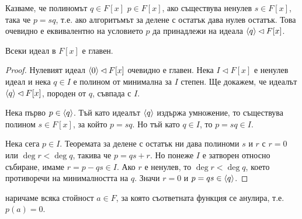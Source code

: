\documentclass[numbers=endperiod, bibliography=totocnumbered]{scrartcl}
\begin{document}
\begin{definition}
  Казваме, че полиномът \( q \in F[x] \)  \( p \in F[x] \), ако съществува ненулев \( s \in F[x] \), така че \( p = sq \), т.е. ако алгоритъмът за делене с остатък дава нулев остатък. Това очевидно е еквивалентно на условието \( p \) да принадлежи на идеала \( \left\langle q \right\rangle \lhd F[x] \).
\end{definition}

\begin{theorem}\label{thm:polynomial_ideals_are_principal}
  Всеки идеал в \( F[x] \) е главен.
\end{theorem}
\begin{proof}
  Нулевият идеал \( \left\langle 0 \right\rangle \lhd F[x] \) очевидно е главен. Нека \( I \lhd F[x] \) е ненулев идеал и нека \( q \in I \) е полином от минимална за \( I \) степен. Ще докажем, че идеалът \( \left\langle q \right\rangle \lhd F[x] \), породен от \( q \), съвпада с \( I \).

  Нека първо \( p \in \left\langle q \right\rangle \). Тъй като идеалът \( \left\langle q \right\rangle \) издържа умножение, то съществува полином \( s \in F[x] \), за който \( p = sq \). Но тъй като \( q \in I \), то \( p = sq \in I \).

  Нека сега \( p \in I \). Теоремата за делене с остатък ни дава полиноми \( s \) и \( r \) с \( r = 0 \) или \( \deg r < \deg q \), такива че \( p = qs + r \). Но понеже \( I \) е затворен относно събиране, имаме \( r = p - qs \in I \). Ако \( r \) е ненулев, то \( \deg r < \deg q \), което противоречи на минималността на \( q \). Значи \( r = 0 \) и \( p = qs \in \left\langle q \right\rangle \).
\end{proof}

\begin{definition}
   наричаме всяка стойност \( a \in F \), за която съответната функция се анулира, т.е. \( p(a) = 0 \).
\end{definition}
\end{document}
